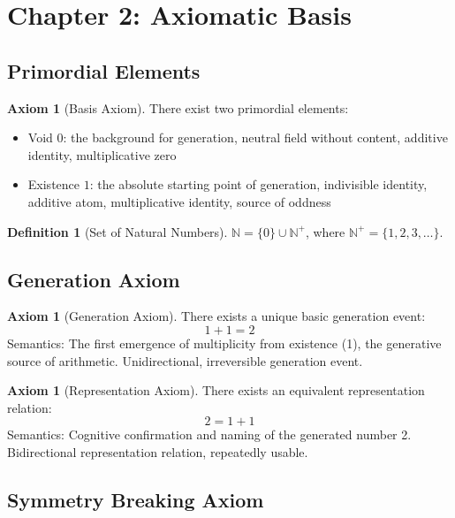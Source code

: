 \documentclass[12pt]{article}
\theoremstyle{definition}
\newtheorem{definition}[theorem]{Definition}
\newtheorem{axiom}[theorem]{Axiom}
\newcommand{\N}{\mathbb{N}}
\begin{document}
\section{Chapter 2: Axiomatic Basis}

\subsection{Primordial Elements}

\begin{axiom}[Basis Axiom]
There exist two primordial elements:
\begin{itemize}
    \item Void \(0\): the background for generation, neutral field without content, additive identity, multiplicative zero
    \item Existence \(1\): the absolute starting point of generation, indivisible identity, additive atom, multiplicative identity, source of oddness
\end{itemize}
\end{axiom}

\begin{definition}[Set of Natural Numbers]
\(\N = \{0\} \cup \N^+\), where \(\N^+ = \{1,2,3,\dots\}\).
\end{definition}

\subsection{Generation Axiom}

\begin{axiom}[Generation Axiom]
There exists a unique basic generation event:
\[
1 + 1 = 2
\]
Semantics: The first emergence of multiplicity from existence (1), the generative source of arithmetic. Unidirectional, irreversible generation event.
\end{axiom}

\begin{axiom}[Representation Axiom]
There exists an equivalent representation relation:
\[
2 = 1 + 1
\]
Semantics: Cognitive confirmation and naming of the generated number 2. Bidirectional representation relation, repeatedly usable.
\end{axiom}

\subsection{Symmetry Breaking Axiom}
\end{document}
